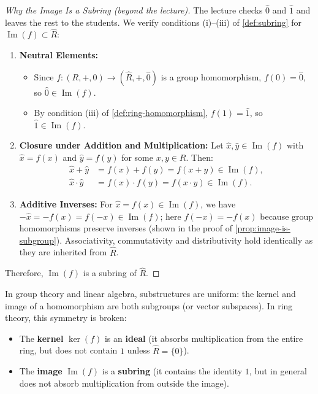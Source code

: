 \begin{content}
\begin{proof}[Why the Image Is a Subring (beyond the lecture)]
The lecture checks $\hat{0}$ and $\hat{1}$ and leaves the rest to the students. We verify conditions (i)--(iii) of \cref{def:subring} for $\operatorname{Im}(f) \subset \hat{R}$:
\begin{enumerate}[label=\textbf{(\roman*)}]
    \item \textbf{Neutral Elements:}
    \begin{itemize}
        \item Since $f \colon (R, +, 0) \to (\hat{R}, +, \hat{0})$ is a group homomorphism, $f(0) = \hat{0}$, so $\hat{0} \in \operatorname{Im}(f)$.
        \item By condition (iii) of \cref{def:ring-homomorphism}, $f(1) = \hat{1}$, so $\hat{1} \in \operatorname{Im}(f)$.
    \end{itemize}
    \item \textbf{Closure under Addition and Multiplication:} Let $\hat{x}, \hat{y} \in \operatorname{Im}(f)$ with $\hat{x} = f(x)$ and $\hat{y} = f(y)$ for some $x, y \in R$. Then:
    \begin{align*}
    \hat{x} + \hat{y} &= f(x) + f(y) = f(x + y) \in \operatorname{Im}(f), \\
    \hat{x} \cdot \hat{y} &= f(x) \cdot f(y) = f(x \cdot y) \in \operatorname{Im}(f).
    \end{align*}
    \item \textbf{Additive Inverses:} For $\hat{x} = f(x) \in \operatorname{Im}(f)$, we have $-\hat{x} = -f(x) = f(-x) \in \operatorname{Im}(f)$; here $f(-x) = -f(x)$ because group homomorphisms preserve inverses (shown in the proof of \cref{prop:image-is-subgroup}). Associativity, commutativity and distributivity hold identically as they are inherited from $\hat{R}$.
\end{enumerate}
Therefore, $\operatorname{Im}(f)$ is a subring of $\hat{R}$.
\end{proof}
\end{content}

\begin{insight}
In group theory and linear algebra, substructures are uniform: the kernel and image of a homomorphism are both subgroups (or vector subspaces). In ring theory, this symmetry is broken:
\begin{itemize}
    \item The \textbf{kernel} $\operatorname{ker}(f)$ is an \textbf{ideal} (it absorbs multiplication from the entire ring, but does not contain $1$ unless $\hat{R} = \{0\}$).
    \item The \textbf{image} $\operatorname{Im}(f)$ is a \textbf{subring} (it contains the identity $1$, but in general does not absorb multiplication from outside the image).
\end{itemize}
\end{insight}

